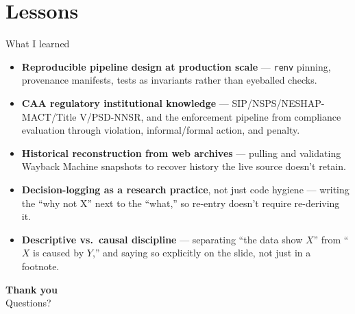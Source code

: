 \documentclass[aspectratio=169,11pt]{beamer}
\begin{document}
\section{Lessons}
\begin{frame}{What I learned}
  \begin{itemize}
    \item \textbf{Reproducible pipeline design at production scale} — \texttt{renv} pinning, provenance
      manifests, tests as invariants rather than eyeballed checks.
    \item \textbf{CAA regulatory institutional knowledge} — SIP/NSPS/NESHAP-MACT/Title V/PSD-NNSR, and the
      enforcement pipeline from compliance evaluation through violation, informal/formal action, and
      penalty.
    \item \textbf{Historical reconstruction from web archives} — pulling and validating Wayback Machine
      snapshots to recover history the live source doesn't retain.
    \item \textbf{Decision-logging as a research practice}, not just code hygiene — writing the ``why not
      X'' next to the ``what,'' so re-entry doesn't require re-deriving it.
    \item \textbf{Descriptive vs.\ causal discipline} — separating ``the data show $X$'' from ``$X$ is
      caused by $Y$,'' and saying so explicitly on the slide, not just in a footnote.
  \end{itemize}
\end{frame}

\begin{frame}[plain]
  \begin{center}
    {\Large\bfseries Thank you}\\[0.5em]
    Questions?
  \end{center}
\end{frame}
\end{document}
